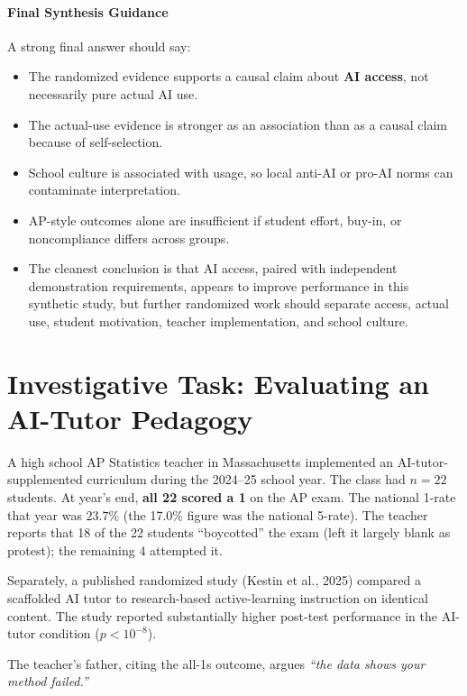 \documentclass[11pt]{article}
\begin{document}
\subsection*{Final Synthesis Guidance}
A strong final answer should say:
\begin{itemize}[leftmargin=*]
  \item The randomized evidence supports a causal claim about
  \textbf{AI access}, not necessarily pure actual AI use.
  \item The actual-use evidence is stronger as an association than as
  a causal claim because of self-selection.
  \item School culture is associated with usage, so local anti-AI or
  pro-AI norms can contaminate interpretation.
  \item AP-style outcomes alone are insufficient if student effort,
  buy-in, or noncompliance differs across groups.
  \item The cleanest conclusion is that AI access, paired with
  independent demonstration requirements, appears to improve
  performance in this synthetic study, but further randomized work
  should separate access, actual use, student motivation, teacher
  implementation, and school culture.
\end{itemize}

\newpage
\part{Investigative Task: Evaluating an AI-Tutor Pedagogy}

\begin{scenario}
A high school AP Statistics teacher in Massachusetts implemented an
AI-tutor-supplemented curriculum during the 2024--25 school year. The
class had $n = 22$ students. At year's end, \textbf{all 22 scored a 1}
on the AP exam. The national 1-rate that year was $\mathbf{23.7\%}$
(the 17.0\% figure was the national 5-rate). The
teacher reports that 18 of the 22 students ``boycotted'' the exam
(left it largely blank as protest); the remaining 4 attempted it.

Separately, a published randomized study (Kestin et al., 2025) compared
a scaffolded AI tutor to research-based active-learning instruction on
identical content. The study reported substantially higher post-test
performance in the AI-tutor condition ($p < 10^{-8}$).

The teacher's father, citing the all-1s outcome, argues
\emph{``the data shows your method failed.''}
\end{scenario}
\end{document}
